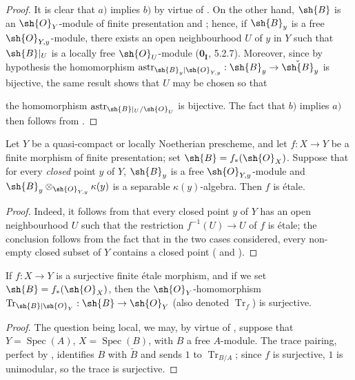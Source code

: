 \begin{proof}
It is clear that $a)$ implies $b)$ by virtue of .
On the other hand, $\sh{B}$ is an $\sh{O}_Y$-module of finite presentation  and ; hence, if $\sh{B}_y$ is a free $\sh{O}_{Y,y}$-module, there exists an open neighbourhood $U$ of $y$ in $Y$ such that $\sh{B}|_U$ is a locally free $\sh{O}_U$-module ($\mathbf{0}_{\mathbf I}$, 5.2.7).  Moreover, since by hypothesis the homomorphism $\operatorname{astr}_{\sh{B}_y|\sh{O}_{Y,y}}:\sh{B}_y\to\check{\sh{B}}_y$ is bijective, the same result shows that $U$ may be chosen so that


the homomorphism $\operatorname{astr}_{\sh{B}|_U/\sh{O}_U}$ is bijective.
The fact that $b)$ implies $a)$ then follows from .
\end{proof}

\begin{corollary}[18.2.5]
\label{IV.18.2.5}
Let $Y$ be a quasi-compact or locally Noetherian prescheme, and let $f:X\to Y$ be a finite morphism of finite presentation;
set $\sh{B}=f_*(\sh{O}_X)$.
Suppose that for every \emph{closed} point $y$ of $Y$, $\sh{B}_y$ is a free $\sh{O}_{Y,y}$-module and $\sh{B}_y\otimes_{\sh{O}_{Y,y}}\kappa(y)$ is a separable $\kappa(y)$-algebra.
Then $f$ is \'etale.
\end{corollary}

\begin{proof}
Indeed, it follows from  that every closed point $y$ of $Y$ has an open neighbourhood $U$ such that the restriction $f^{-1}(U)\to U$ of $f$ is \'etale;
the conclusion follows from the fact that in the two cases considered, every non-empty closed subset of $Y$ contains a closed point ( and ).
\end{proof}

\begin{corollary}[18.2.6]
\label{IV.18.2.6}
If $f:X\to Y$ is a surjective finite \'etale morphism, and if we set $\sh{B}=f_*(\sh{O}_X)$, then the $\sh{O}_Y$-homomorphism $\operatorname{Tr}_{\sh{B}|\sh{O}_Y}:\sh{B}\to\sh{O}_Y$  (also denoted $\operatorname{Tr}_f$) is surjective.
\end{corollary}

\begin{proof}
The question being local, we may, by virtue of , suppose that $Y=\operatorname{Spec}(A)$, $X=\operatorname{Spec}(B)$, with $B$ a free $A$-module.
The trace pairing, perfect by , identifies $B$ with $\check{B}$ and sends $1$ to $\operatorname{Tr}_{B/A}$; since $f$ is surjective, $1$ is unimodular, so the trace is surjective.
\end{proof}

